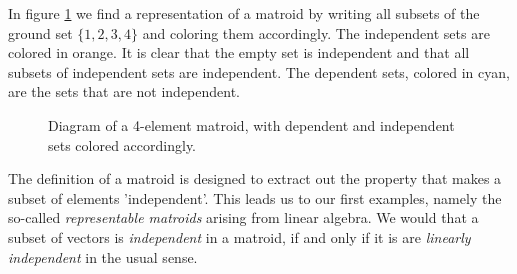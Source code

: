 In  figure \ref{fig:1234-matroid-independent-sets} we find a representation of a matroid by writing all subsets of the ground set $\{1,2,3,4\}$ and coloring them accordingly. The independent sets are colored in orange. It is clear that the empty set is independent and that all subsets of independent sets are independent. The dependent sets, colored in cyan, are the sets that are not independent.


\begin{figure}[h]

\begin{center}
\end{center}
\caption{Diagram of a 4-element matroid, with dependent and independent sets colored accordingly.}
\label{fig:1234-matroid-independent-sets}
\end{figure}


The definition of a matroid is designed to extract out the property that makes a subset of elements 'independent'. This leads us to our first examples, namely the so-called \textit{representable matroids} arising from linear algebra. We would that a subset of vectors is \textit{independent} in a matroid, if and only if it is are \textit{linearly independent} in the usual sense. 



